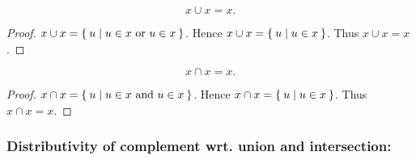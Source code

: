 \documentclass[../../set-theory.ftl.tex]{subfiles}
\begin{document}
  \begin{forthel}
    \begin{proposition}\label{SetTheory_01_01_496190}
      \[ x \cup x = x. \]
    \end{proposition}
    \begin{proof}
      $x \cup x = \Set{u | \text{$u \in x$ or $u \in x$}}$.
      Hence $x \cup x = \Set{u | u \in x}$.
      Thus $x \cup x = x$.
    \end{proof}

    \begin{proposition}\label{SetTheory_01_01_783425}
      \[ x \cap x = x. \]
    \end{proposition}
    \begin{proof}
      $x \cap x = \Set{u | \text{$u \in x$ and $u \in x$}}$.
      Hence $x \cap x = \Set{u | u \in x}$.
      Thus $x \cap x = x$.
    \end{proof}
  \end{forthel}


  \subsubsection*{Distributivity of complement wrt. union and intersection:}
\end{document}
